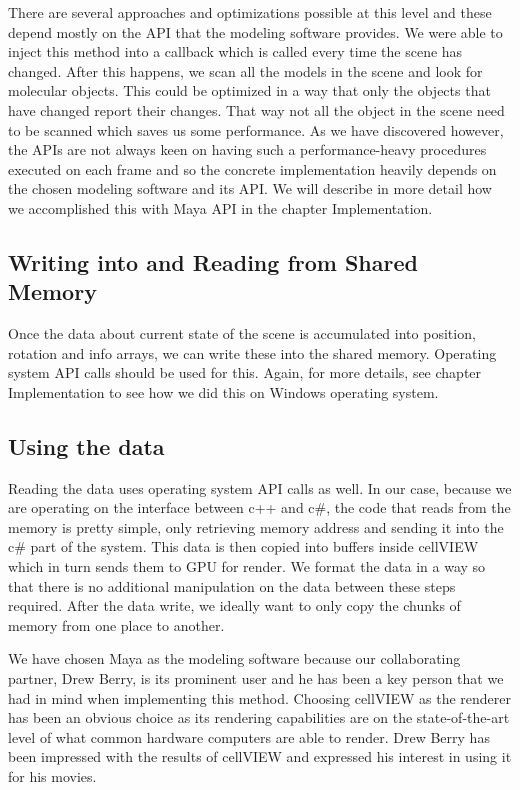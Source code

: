 \documentclass[
  digital, %
  table,   %
  nolof,     %
  nolot,     %
]{fithesis3}
\begin{document}
There are several approaches and optimizations possible at this level and these depend mostly on the API that the modeling software provides. We were able to inject this method into a callback which is called every time the scene has changed. After this happens, we scan all the models in the scene and look for molecular objects. This could be optimized in a way that only the objects that have changed report their changes. That way not all the object in the scene need to be scanned which saves us some performance. As we have discovered however, the APIs are not always keen on having such a performance-heavy procedures executed on each frame and so the concrete implementation heavily depends on the chosen modeling software and its API. We will describe in more detail how we accomplished this with Maya API in the chapter Implementation.

\subsection{Writing into and Reading from Shared Memory}
Once the data about current state of the scene is accumulated into position, rotation and info arrays, we can write these into the shared memory. Operating system API calls should be used for this. Again, for more details, see chapter Implementation to see how we did this on Windows operating system.

\subsection{Using the data}
Reading the data uses operating system API calls as well. In our case, because we are operating on the interface between c++ and c\#, the code that reads from the memory is pretty simple, only retrieving memory address and sending it into the c\# part of the system. This data is then copied into buffers inside cellVIEW which in turn sends them to GPU for render. We format the data in a way so that there is no additional manipulation on the data between these steps required. After the data write, we ideally want to only copy the chunks of memory from one place to another.

We have chosen Maya as the modeling software because our collaborating partner, Drew Berry, is its prominent user and he has been a key person that we had in mind when implementing this method. Choosing cellVIEW as the renderer has been an obvious choice as its rendering capabilities are on the state-of-the-art level of what common hardware computers are able to render. Drew Berry has been impressed with the results of cellVIEW and expressed his interest in using it for his movies.
\end{document}
